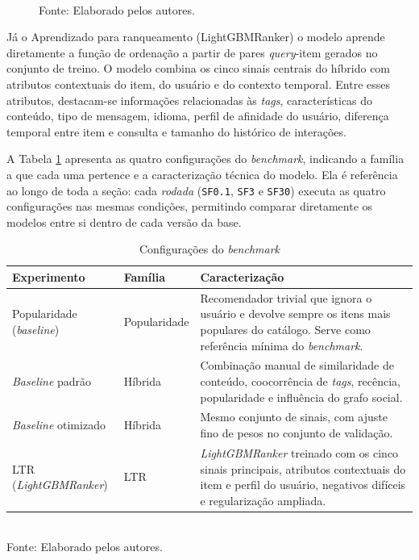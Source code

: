 \documentclass[a4paper,12pt]{article}
\begin{document}
{\begin{figure}[H]
\small \\ Fonte: Elaborado pelos autores.
\end{figure}

Já o Aprendizado para ranqueamento (LightGBMRanker) o modelo aprende diretamente a função de ordenação a partir de pares \textit{query}-item gerados no conjunto de treino. O modelo combina os cinco sinais centrais do híbrido com atributos contextuais do item, do usuário e do contexto temporal. Entre esses atributos, destacam-se informações relacionadas às  \textit{tags}, características do conteúdo, tipo de mensagem, idioma, perfil de afinidade do usuário, diferença temporal entre item e consulta e tamanho do histórico de interações.

A Tabela \ref{tab:configuracoes_benchmark_tcc} apresenta as quatro configurações do \textit{benchmark}, indicando a família a que cada uma pertence e a caracterização técnica do modelo. Ela é referência ao longo de toda a seção: cada \textit{rodada} (\texttt{SF0.1}, \texttt{SF3} e \texttt{SF30}) executa as quatro configurações nas mesmas condições, permitindo comparar diretamente os modelos entre si dentro de cada versão da base.

\begin{table}[H]
\centering
\caption{Configurações do \textit{benchmark}}
\label{tab:configuracoes_benchmark_tcc}
\small
\begin{tabular}{|p{3.2cm}|p{2.2cm}|p{9.0cm}|}
\hline
\textbf{Experimento} & \textbf{Família} & \textbf{Caracterização} \\
\hline
Popularidade (\textit{baseline}) & Popularidade & Recomendador trivial que ignora o usuário e devolve sempre os itens mais populares do catálogo. Serve como referência mínima do \textit{benchmark}. \\
\hline
\textit{Baseline} padrão & Híbrida & Combinação manual de similaridade de conteúdo, coocorrência de \textit{tags}, recência, popularidade e influência do grafo social. \\
\hline
\textit{Baseline} otimizado & Híbrida & Mesmo conjunto de sinais, com ajuste fino de pesos no conjunto de validação. \\
\hline
LTR (\textit{LightGBMRanker}) & LTR & \textit{LightGBMRanker} treinado com os cinco sinais principais, atributos contextuais do item e perfil do usuário, negativos difíceis e regularização ampliada. \\
\hline
\end{tabular}
\small \\ Fonte: Elaborado pelos autores.
\end{table}

}
\end{document}
